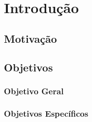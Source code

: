 \chapter{Introdução}
\label{chap:introducao}

\lipsum[2]
\lipsum[2]
\lipsum[2]

\section{Motivação}
\lipsum[2]
\lipsum[2]

\section{Objetivos}

\subsection{Objetivo Geral}
\lipsum[2]

\subsection{Objetivos Específicos}
	\lipsum[2]
	
	\begin{alineas}
		\item \lipsum[2]
		\item \lipsum[2]
		\begin{alineas}
			\item \lipsum[2]
			\item \lipsum[2]
		\end{alineas}
		\item \lipsum[2]	
	\end{alineas}
	
	\lipsum[2]
